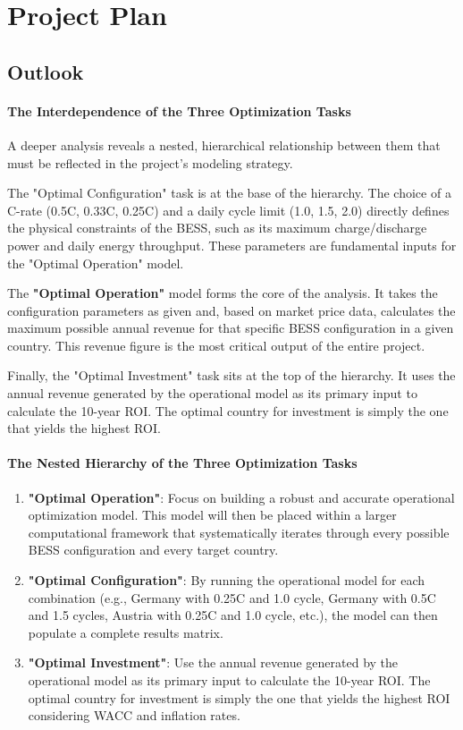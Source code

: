 \section{Project Plan}

\subsection*{Outlook}
\paragraph{The Interdependence of the Three Optimization Tasks}
A deeper analysis reveals a nested, hierarchical relationship between them that must be reflected in the project's modeling strategy.

The "Optimal Configuration" task is at the base of the hierarchy. The choice of a C-rate (0.5C, 0.33C, 0.25C) and a daily cycle limit (1.0, 1.5, 2.0) directly defines the physical constraints of the BESS, such as its maximum charge/discharge power and daily energy throughput. These parameters are fundamental inputs for the "Optimal Operation" model. 

The \textbf{"Optimal Operation"} model forms the core of the analysis. It takes the configuration parameters as given and, based on market price data, calculates the maximum possible annual revenue for that specific BESS configuration in a given country. This revenue figure is the most critical output of the entire project.

Finally, the "Optimal Investment" task sits at the top of the hierarchy. It uses the annual revenue generated by the operational model as its primary input to calculate the 10-year ROI. The optimal country for investment is simply the one that yields the highest ROI.

\paragraph{The Nested Hierarchy of the Three Optimization Tasks}
\begin{enumerate}
    \item \textbf{"Optimal Operation"}: Focus on building a robust and accurate operational optimization model. This model will then be placed within a larger computational framework that systematically iterates through every possible BESS configuration and every target country. 
    \item \textbf{"Optimal Configuration"}: By running the operational model for each combination (e.g., Germany with 0.25C and 1.0 cycle, Germany with 0.5C and 1.5 cycles, Austria with 0.25C and 1.0 cycle, etc.), the model can then populate a complete results matrix.
    \item \textbf{"Optimal Investment"}: Use the annual revenue generated by the operational model as its primary input to calculate the 10-year ROI. The optimal country for investment is simply the one that yields the highest ROI considering WACC and inflation rates.
\end{enumerate}


